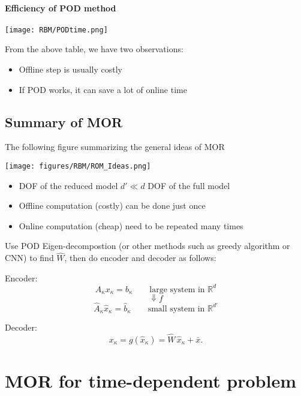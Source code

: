 \paragraph{Efficiency of POD method}
\begin{center}
\texttt{[image: RBM/PODtime.png]}
\end{center}
From the above table, we have two observations: 
\begin{itemize}
\item Offline step is usually costly
\item If POD works, it can save a lot of online time
\end{itemize}

\subsection{Summary of MOR}
The following figure summarizing the general ideas of MOR
\begin{center}
   \texttt{[image: figures/RBM/ROM\_Ideas.png]}
\end{center}
\begin{itemize}
\item DOF of the reduced model {\color{blue} $d' \ll d$} DOF of the full model
\item Offline computation (costly) can be done just once
\item Online computation (cheap) need to be repeated many times
\end{itemize}

Use POD Eigen-decompostion (or other methods such as greedy algorithm or CNN) to find $\hat{W}$, then do encoder and decoder as follows:

Encoder:
$$
A_{\kappa}x_{\kappa}=b_{\kappa}  \qquad \text{large system in $\mathbb{R}^d$}
$$
$$
\Downarrow f 
$$
%
$$
{\hat{A}_{\kappa}} \hat{x}_{\kappa} = \hat{b}_\kappa \qquad \text{small system in $\mathbb{R}^{d'}$}
$$

Decoder:
$$
x_{\kappa}= g(\hat{x}_{\kappa}) = \hat W \,  \hat{x}_{\kappa} + \bar{x}. 
$$



\section{MOR for time-dependent problem}
